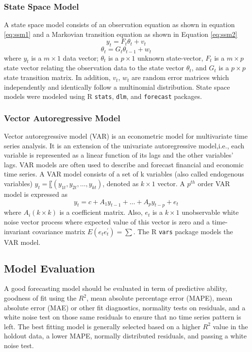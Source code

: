 \subsubsection{State Space Model}
A state space model consists of an observation equation as shown in equation \ref{eq:ssm1} and a Markovian transition equation as shown in Equation \ref{eq:ssm2} 
\begin{equation}
y_t=F_t \theta_t +v_t
\label{eq:ssm1}
\end{equation}
\begin{equation}
\theta_t=G_t\theta_{t-1} + w_t
\label{eq:ssm2}
\end{equation}
where $y_t$ is a $m \times 1$ data vector; $\theta_t$  is a $p\times1$ unknown state-vector, $F_t$ is a $m\times p$ state vector relating the observation data to the state vector $\theta_t$, and $G_t$ is a $p\times p$ state transition matrix. In addition, $v_t$, $w_t$ are random error matrices which independently and identically follow a multinomial distribution. State space models were modeled using R {\tt stats}, {\tt dlm}, and {\tt forecast} packages. 

\subsubsection{Vector Autoregressive Model}
Vector autoregressive model (VAR) is an econometric model for multivariate time series analysis. It is an extension of the univariate autoregressive model,i.e., each variable is represented as a linear function of its lags and the other variables' lags. VAR models are often used to describe and forecast financial and economic time series. A VAR model consists of a set of k variables (also called endogenous variables) $y_t=〖(y_{1t}, y_{2t}, \dots, y_{kt})$, denoted as $k\times1$ vector. A $p^{th}$ order VAR model is expressed as 
\begin{equation}
y_t=c+A_1y_{t-1}+\dots +A_py_{t-p}+e_t
\end{equation}
where $A_i(k \times k)$ is a coefficient matrix. Also, $e_t$  is a $k \times 1$ unobservable white noise vector process where expected value of this vector is zero and a time-invariant covariance matrix $E(e_t e_t^{'})=\sum$. The R {\tt vars} package models the VAR model.
\subsection{Model Evaluation}
A good forecasting model should be evaluated in term of predictive ability, goodness of fit using the $R^2$, mean absolute percentage error (MAPE), mean absolute error (MAE) or other fit diagnostics, normality tests on residuals, and a white noise test on those same residuals to ensure that no time series pattern is left. The best fitting model is generally selected based on a higher $R^2$ value in the holdout data, a lower MAPE, normally distributed residuals, and passing a white noise test. 

